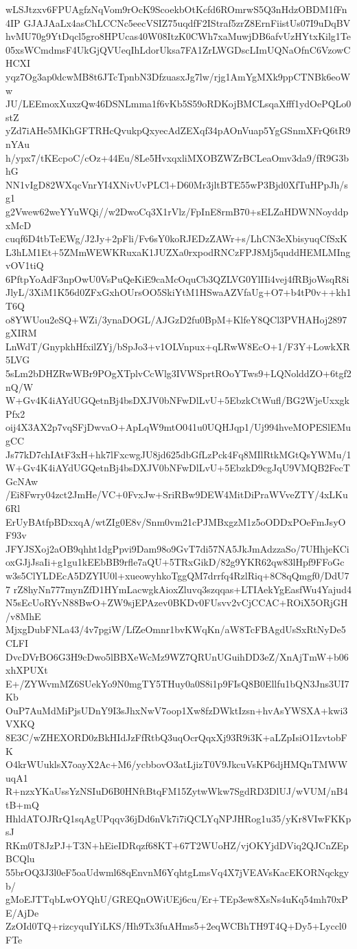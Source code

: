 wLSJtzxv6FPUAgfzNqVom9rOcK9ScoekbOtKcfd6ROmrwS5Q3nHdzOBDM1fFn4IP
GJAJAaLx4asChLCCNc5eecVSIZ75uqdfF2IStraf5zrZ8ErnFiistUs07I9uDqBV
hvMU70g9YtDqcl5gro8HPUcas40W08ItzK0CWh7xaMuwjDB6afvUzHYtxKilg1Te
05xsWCmdmsF4UkGjQVUeqIhLdorUksa7FA1ZrLWGDscLImUQNaOfnC6VzowCHCXI
yqz7Og3ap0dcwMB8t6JTcTpnbN3DfzuasxJg7lw/rjg1AmYgMXk9ppCTNBk6eoWw
JU/LEEmoxXuxzQw46DSNLmma1f6vKb5S59oRDKojBMCLsqaXfff1ydOePQLo0stZ
yZd7iAHe5MKhGFTRHcQvukpQxyecAdZEXqf34pAOnVuap5YgGSnmXFrQ6tR9nYAu
h/ypx7/tKEcpoC/cOz+44Eu/8Le5HvxqxliMXOBZWZrBCLeaOmv3da9/fR9G3bhG
NN1vIgD82WXqcVnrYI4XNivUvPLCl+D60Mr3jltBTE55wP3Bjd0XfTuHPpJh/sg1
g2Vwew62weYYuWQi//w2DwoCq3X1rVlz/FpInE8rmB70+sELZaHDWNNoyddpxMcD
cuqf6D4tbTeEWg/J2Jy+2pFli/Fv6sY0koRJEDzZAWr+s/LhCN3eXbisyuqCfSxK
L3hLM1Et+5ZMmWEWKRuxaK1JUZXa0rxpodRNCzFPJ8Mj5quddHEMLMIngvOV1tiQ
6PftpYoAdF3npOwU0VsPuQeKiE9caMcOquCb3QZLVG0YlIIi4vej4fRBjoWsqR8i
JlyL/3XiM1K56d0ZFxGxhOUrsOO5SkiYtM1HSwaAZVfaUg+O7+b4tP0v++kh1T6Q
o8YWUou2eSQ+WZi/3ynaDOGL/AJGzD2fu0BpM+KlfeY8QCl3PVHAHoj2897gXIRM
LnWdT/GnypkhHfxilZYj/bSpJo3+v1OLVnpux+qLRwW8EcO+1/F3Y+LowkXR5LVG
5sLm2bDHZRwWBr9POgXTplvCcWlg3IVWSprtROoYTws9+LQNolddZO+6tgf2nQ/W
W+Gv4K4iAYdUGQetnBj4bsDXJV0bNFwDlLvU+5EbzkCtWufl/BG2WjeUxxgkPfx2
oij4X3AX2p7vqSFjDwvaO+ApLqW9mtO041u0UQHJqp1/Uj994hveMOPESlEMugCC
Js77kD7chIAtF3xH+hk7lFxcwgJU8jd625dbGfLzPck4Fq8MIlRtkMGtQsYWMu/1
W+Gv4K4iAYdUGQetnBj4bsDXJV0bNFwDlLvU+5EbzkD9cgJqU9VMQB2FecTGcNAw
/Ei8Fwry04zct2JmHe/VC+0FvxJw+SriRBw9DEW4MitDiPraWVveZTY/4xLKu6Rl
ErUyBAtfpBDxxqA/wtZIg0E8v/Snm0vm21cPJMBxgzM1z5oODDxPOeFmJsyOF93v
JFYJSXoj2aOB9qhht1dgPpvi9Dam98o9GvT7di57NA5JkJmAdzzaSo/7UHhjeKCi
oxGJjJsaIi+g1gu1kEEbBB9rfle7aQU+5TRxGikD/82g9YKR62qw83lHpf9FFoGc
w3s5ClYLDEcA5DZYIU0l+xueowyhkoTggQM7drrfq4RzlRiq+8C8qQmgf0/DdU77
rZ8hyNn777mynZfD1HYmLacwgkAioxZluvq3szqqas+LTIAekYgEasfWu4Yajud4
N5sEcUoRYvN88BwO+ZW9sjEPAzev0BKDv0FUsvv2vCjCCAC+ROiX5ORjGH/v8MhE
MjxgDubFNLa43/4v7pgiW/LfZeOmnr1bvKWqKn/aW8TcFBAgdUsSxRtNyDe5CLFI
DvcDVrBO6G3H9cDwo5lBBXeWcMz9WZ7QRUnUGuihDD3eZ/XnAjTmW+b06xhXPUXt
E+/ZYWvmMZ6SUekYo9N0mgTY5THuy0a0S8i1p9FIsQ8B0Ellfu1bQN3Jns3UI7Kb
OuP7AuMdMiPjsUDnY9I3sJhxNwV7oop1Xw8fzDWktIzsn+hvAsYWSXA+kwi3VXKQ
8E3C/wZHEXORD0zBkHIdJzFfRtbQ3uqOcrQqxXj93R9i3K+aLZpIsiO1IzvtobFK
O4krWUuklsX7oayX2Ac+M6/ycbbovO3atLjizT0V9JkcuVsKP6djHMQnTMWWuqA1
R+nzxYKaUssYzNSIuD6B0HNftBtqFM15ZytwWkw7SgdRD3DlUJ/wVUM/nB4tB+mQ
HhldATOJRrQ1sqAgUPqqv36jDd6nVk7i7iQCLYqNPJHRog1u35/yKr8VIwFKKpsJ
RKm0T8JzPJ+T3N+hEieIDRqzf68KT+67T2WUoHZ/vjOKYjdDViq2QJCnZEpBCQlu
55brOQ3J3l0eF5oaUdwml68qEnvnM6YqhtgLmsVq4X7jVEAVsKacEKORNqckgyb/
gMoEJTTqbLwOYQhU/GREQnOWiUEj6cu/Er+TEp3ew8XsNs4uKq54mh70xPE/AjDe
ZzOId0TQ+rizcyquIYiLKS/Hh9Tx3fuAHms5+2eqWCBhTH9T4Q+Dy5+Lyccl0FTe
